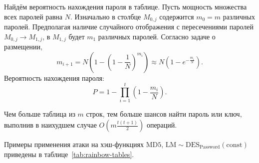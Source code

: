 Найдём вероятность нахождения пароля в таблице. Пусть мощность множества всех паролей равна $N$. Изначально в столбце $M_{0,j}$ содержится $m_0 = m$ различных паролей. Предполагая наличие случайного отображения с пересечениями паролей $M_{0,j} \rightarrow M_{1,j}$, в $M_{1,j}$ будет $m_1$ различных паролей. Согласно задаче о размещении,
\[
    m_{i+1} = N \left( 1 - \left( 1 - \frac{1}{N} \right)^{m_i} \right) \approx N \left( 1 - e^{-\frac{m_i}{N}} \right).
\]
Вероятность нахождения пароля:
\[
    P = 1 - \prod \limits_{i=1}^t \left( 1 - \frac{m_i}{N} \right).
\]

Чем больше таблица из $m$ строк, тем больше шансов найти пароль или ключ, выполнив в наихудшем случае   $O \left( m \frac{t(t+1)}{2} \right)$ операций.

Примеры применения атаки на хэш-функциях $\textrm{MD5}$, $\textrm{LM} \sim \textrm{DES}_{\textrm{Password}} (\textrm{const})$ приведены в таблице~\ref{tab:rainbow-tables}.

\begin{table}[!ht]
    \centering
    \caption{Атаки на радужных таблицах на \emph{одном} ПК\label{tab:rainbow-tables}}
\end{table}

